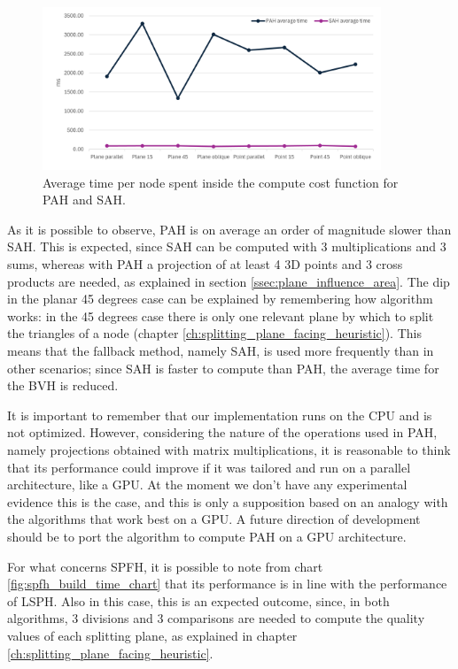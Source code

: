 \documentclass{PoliMi_MasterThesis}
\begin{document}
\begin{figure}[H] 
	\centering
	\includegraphics[width=0.9\textwidth]{Images/pah_build_time_chart.png}
	\caption{Average time per node spent inside the compute cost function for PAH and SAH.}
	\label{fig:pah_build_time_chart}
\end{figure}

As it is possible to observe, PAH is on average an order of magnitude slower than SAH. This is expected, since SAH can be computed with 3 multiplications and 3 sums, whereas with PAH a projection of at least 4 3D points and 3 cross products are needed, as explained in section \ref{ssec:plane_influence_area}. The dip in the planar 45 degrees case can be explained by remembering how algorithm works: in the 45 degrees case there is only one relevant plane by which to split the triangles of a node (chapter \ref{ch:splitting_plane_facing_heuristic}). This means that the fallback method, namely SAH, is used more frequently than in other scenarios; since SAH is faster to compute than PAH, the average time for the BVH is reduced.

It is important to remember that our implementation runs on the CPU and is not optimized. However, considering the nature of the operations used in PAH, namely projections obtained with matrix multiplications, it is reasonable to think that its performance could improve if it was tailored and run on a parallel architecture, like a GPU. At the moment we don't have any experimental evidence this is the case, and this is only a supposition based on an analogy with the algorithms that work best on a GPU. A future direction of development should be to port the algorithm to compute PAH on a GPU architecture.

For what concerns SPFH, it is possible to note from chart \ref{fig:spfh_build_time_chart} that its performance is in line with the performance of LSPH. Also in this case, this is an expected outcome, since, in both algorithms, 3 divisions and 3 comparisons are needed to compute the quality values of each splitting plane, as explained in chapter \ref{ch:splitting_plane_facing_heuristic}.
\end{document}
